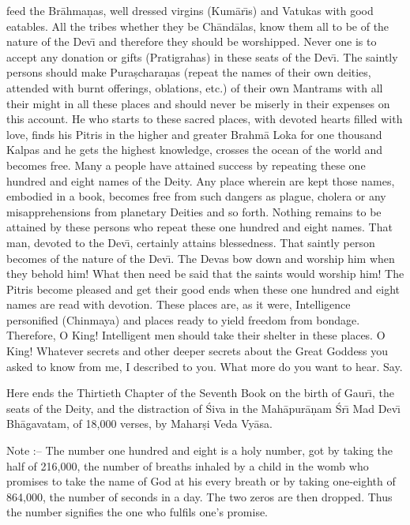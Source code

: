 feed the Br\=ahma\d{n}as, well dressed virgins (Kum\=ar\={\i}s) and Vatukas with good eatables. All the tribes whether they be Ch\=and\=alas, know them all to be of the nature of the Dev\={\i} and therefore they should be worshipped. Never one is to accept any donation or gifts (Pratigrahas) in these seats of the Dev\={\i}. The saintly persons should make Pura\d{s}chara\d{n}as (repeat the names of their own deities, attended with burnt offerings, oblations, etc.) of their own Mantrams with all their might in all these places and should never be miserly in their expenses on this account. He who starts to these sacred places, with devoted hearts filled with love, finds his Pitris in the higher and greater Brahm\=a Loka for one thousand Kalpas and he gets the highest knowledge, crosses the ocean of the world and becomes free. Many a people have attained success by repeating these one hundred and eight names of the Deity. Any place wherein are kept those names, embodied in a book, becomes free from such dangers as plague, cholera or any misapprehensions from planetary Deities and so forth. Nothing remains to be attained by these persons who repeat these one hundred and eight names. That man, devoted to the Dev\={\i}, certainly attains blessedness. That saintly person becomes of the nature of the Dev\={\i}. The Devas bow down and worship him when they behold him! What then need be said that the saints would worship him! The Pitris become pleased and get their good ends when these one hundred and eight names are read with devotion. These places are, as it were, Intelligence personified (Chinmaya) and places ready to yield freedom from bondage. Therefore, O King! Intelligent men should take their shelter in these places. O King! Whatever secrets and other deeper secrets about the Great Goddess you asked to know from me, I described to you. What more do you want to hear. Say.

Here ends the Thirtieth Chapter of the Seventh Book on the birth of Gaur\={\i}, the seats of the Deity, and the distraction of \'Siva in the Mah\=apur\=a\d{n}am \'Sr\={\i} Mad Dev\={\i} Bh\=agavatam, of 18,000 verses, by Mahar\d{s}i Veda Vy\=asa.

Note :-- The number one hundred and eight is a holy number, got by taking the half of 216,000, the number of breaths inhaled by a child in the womb who promises to take the name of God at his every breath or by taking one-eighth of 864,000, the number of seconds in a day. The two zeros are then dropped. Thus the number signifies the one who fulfils one's promise.



